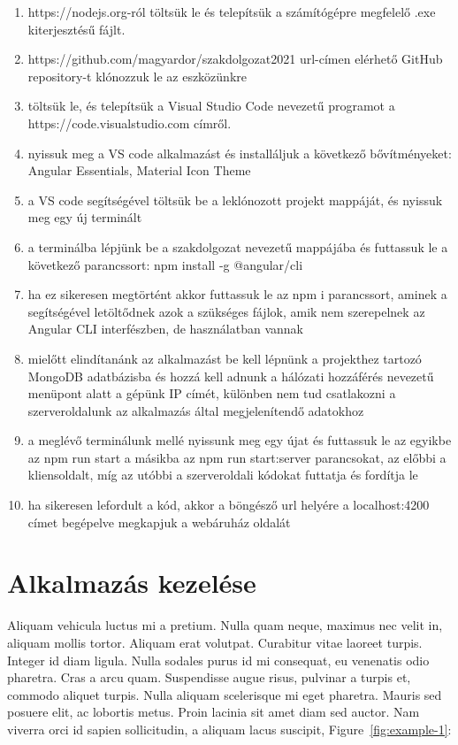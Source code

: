 \begin{enumerate}
	\item\label{step:first} https://nodejs.org-ról töltsük le és telepítsük a számítógépre megfelelő .exe kiterjesztésű fájlt.
	\item https://github.com/magyardor/szakdolgozat2021 url-címen elérhető GitHub repository-t klónozzuk le az eszközünkre
	\item töltsük le, és telepítsük a Visual Studio Code nevezetű programot a https://code.visualstudio.com címről.
	\item nyissuk meg a VS code alkalmazást és installáljuk a következő bővítményeket: Angular Essentials, Material Icon Theme
	\item a VS code segítségével töltsük be a leklónozott projekt mappáját, és nyissuk meg egy új terminált
	\item a terminálba lépjünk be a szakdolgozat nevezetű mappájába és futtassuk le a következő parancssort: npm install -g @angular/cli
	\item ha ez sikeresen megtörtént akkor futtassuk le az npm i parancssort, aminek a segítségével letöltődnek azok a szükséges fájlok, amik nem szerepelnek az Angular CLI interfészben, de használatban vannak 
	\item mielőtt elindítanánk az alkalmazást be kell lépnünk a projekthez tartozó MongoDB adatbázisba és hozzá kell adnunk a hálózati hozzáférés nevezetű menüpont alatt a gépünk IP címét, különben nem tud csatlakozni a szerveroldalunk az alkalmazás által megjelenítendő adatokhoz
	\item a meglévő terminálunk mellé nyissunk meg egy újat és futtassuk le az egyikbe az npm run start a másikba az npm run start:server parancsokat, az előbbi a kliensoldalt, míg az utóbbi a szerveroldali kódokat futtatja és fordítja le
	\item ha sikeresen lefordult a kód, akkor a böngésző url helyére a localhost:4200 címet begépelve megkapjuk a webáruház oldalát
\end{enumerate}


\section{Alkalmazás kezelése} %

Aliquam vehicula luctus mi a pretium. Nulla quam neque, maximus nec velit in, aliquam mollis tortor. Aliquam erat volutpat. Curabitur vitae laoreet turpis. Integer id diam ligula. Nulla sodales purus id mi consequat, eu venenatis odio pharetra. Cras a arcu quam. Suspendisse augue risus, pulvinar a turpis et, commodo aliquet turpis. Nulla aliquam scelerisque mi eget pharetra. Mauris sed posuere elit, ac lobortis metus. Proin lacinia sit amet diam sed auctor. Nam viverra orci id sapien sollicitudin, a aliquam lacus suscipit, Figure~\ref{fig:example-1}:

